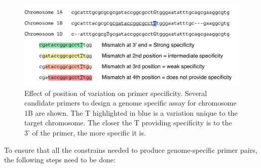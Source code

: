 \begin{figure}
\includegraphics[width=1\textwidth]{PolyMarker/Figures/intro/specificPosition.pdf}
\caption[Effect of position of variation on primer specificity.]{Effect of position of variation on primer specificity. Several candidate primers to design a genome specific assay for chromosome 1B are shown. The T highlighted in blue is a variation unique to the target chromosome. The closer the T providing specificity is to the 3' of the primer, the more specific it is. }
\label{fig:poly:3PrimeRules}
\end{figure}


To ensure that all the constrains needed to produce genome-specific primer pairs, the following steps need to be done: 

